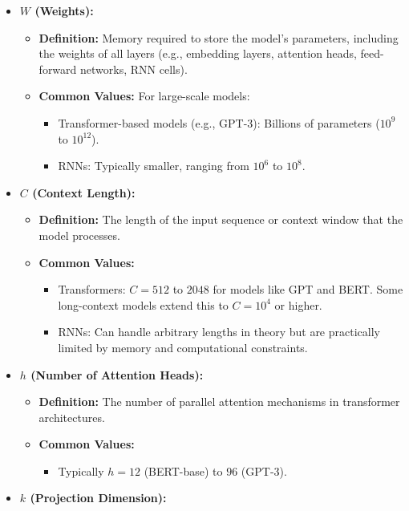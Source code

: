 \documentclass{article}
\begin{document}
\begin{itemize}
    \item \textbf{\(W\) (Weights):}
    \begin{itemize}
        \item \textbf{Definition:} Memory required to store the model's parameters, including the weights of all layers (e.g., embedding layers, attention heads, feed-forward networks, RNN cells).
        \item \textbf{Common Values:} For large-scale models:
        \begin{itemize}
            \item Transformer-based models (e.g., GPT-3): Billions of parameters (\(10^{9}\) to \(10^{12}\)).
            \item RNNs: Typically smaller, ranging from \(10^{6}\) to \(10^{8}\).
        \end{itemize}
    \end{itemize}
    \item \textbf{\(C\) (Context Length):}
    \begin{itemize}
        \item \textbf{Definition:} The length of the input sequence or context window that the model processes.
        \item \textbf{Common Values:}
        \begin{itemize}
            \item Transformers: \(C = 512\) to \(2048\) for models like GPT and BERT. Some long-context models extend this to \(C = 10^4\) or higher.
            \item RNNs: Can handle arbitrary lengths in theory but are practically limited by memory and computational constraints.
        \end{itemize}
    \end{itemize}
    \item \textbf{\(h\) (Number of Attention Heads):}
    \begin{itemize}
        \item \textbf{Definition:} The number of parallel attention mechanisms in transformer architectures.
        \item \textbf{Common Values:}
        \begin{itemize}
            \item Typically \(h = 12\) (BERT-base) to \(96\) (GPT-3).
        \end{itemize}
    \end{itemize}
    \item \textbf{\(k\) (Projection Dimension):}

\end{itemize}
\end{document}
